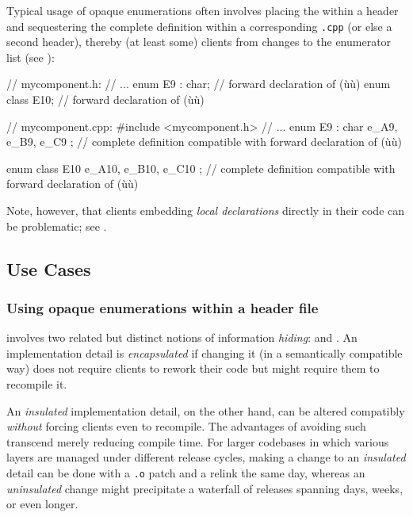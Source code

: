 \noindent Typical usage of opaque enumerations often involves placing the
 within a header and sequestering the
complete definition within a corresponding \lstinline!.cpp! (or else a
second header), thereby  (at least some) clients from
changes to the enumerator list (see ):

\begin{emcppslisting}
// mycomponent.h:
// ...
enum E9 : char;   // forward declaration of (ù{}ù)
enum class E10;   // forward declaration of (ù{}ù)


// mycomponent.cpp:
#include <mycomponent.h>
// ...
enum E9 : char { e_A9, e_B9, e_C9 };
    // complete definition compatible with forward declaration of (ù{}ù)

enum class E10 { e_A10, e_B10, e_C10 };
    // complete definition compatible with forward declaration of (ù{}ù)
\end{emcppslisting}

\noindent Note, however, that clients embedding \emph{local declarations} directly
in their code can be problematic; see .

\subsection[Use Cases]{Use Cases}\label{use-cases-opaqueenum}

\subsubsection[Using opaque enumerations within a header file]{Using opaque enumerations within a header file}\label{using-opaque-enumerations-within-a-header-file}

 involves two related but distinct notions of
information \emph{hiding}:  and .
An implementation detail is \emph{encapsulated} if changing it (in a
semantically compatible way) does not require clients to rework their
code but might require them to recompile it.

An \emph{insulated} implementation detail, on the other hand, can be
altered compatibly \emph{without} forcing clients even to recompile.
The advantages of avoiding such  transcend
merely reducing compile time. For larger codebases in which various
layers are managed under different release cycles, making a change to an
\emph{insulated} detail can be done with a \lstinline!.o! patch and a
relink the same day, whereas an \emph{uninsulated} change might
precipitate a waterfall of releases spanning days, weeks, or even
longer.

